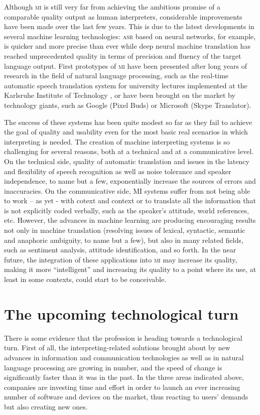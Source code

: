 \documentclass[output=paper]{langsci/langscibook}
\begin{document}
Although \textsc{mi} is still very far from achieving  the ambitious promise of a comparable quality output as human interpreters, considerable improvements have been made over the last few years. This is due to the latest developments in several machine learning technologies: \textsc{asr} based on neural networks, for example, is quicker and more precise than ever while deep neural machine translation has reached unprecedented quality in terms of precision and fluency of the target language output. First prototypes of \textsc{mi} have been presented after long years of research in the field of natural language processing, such as the real-time automatic speech translation system for university lectures implemented at the Karlsruhe Institute of Technology \citep{muller_lecture_2016}, or have been brought on the market by technology giants, such as Google (Pixel Buds) or Microsoft (Skype Translator).  
 
The success of these systems has been quite modest so far as they fail to achieve the goal of quality and usability even for the most basic real scenarios in which interpreting is needed. The creation of machine interpreting systems is so challenging for several reasons, both at a technical and at a communicative level. On the technical side, quality of automatic translation and issues in the latency and flexibility of speech recognition as well as noise tolerance and speaker independence, to name but a few, exponentially increase the sources of errors and inaccuracies. On the communicative side, \textsc{MI} systems suffer from not being able to work – as yet - with cotext and context or to translate all the information that is not explicitly coded verbally, such as the speaker's attitude, world references, etc. However, the advances in machine learning are producing encouraging results not only in machine translation (resolving issues of lexical, syntactic, semantic and anaphoric ambiguity, to name but a few), but also in many related fields, such as sentiment analysis, attitude identification, and so forth. In the near future, the integration of these applications into \textsc{mi} may increase its quality, making it more ``intelligent'' and increasing its quality to a point where its use, at least in some contexts, could start to be conceivable.
 
\section{The upcoming technological turn} 
There is some evidence that the profession is heading towards a technological turn. First of all, the interpreting-related solutions brought about by new advances in information and communication technologies as well as in natural language processing are growing in number, and the speed of change is significantly faster than it was in the past. In the three areas indicated above, companies are investing time and effort in order to launch an ever increasing number of software and devices on the market, thus reacting to users’ demands but also creating new ones.
 
\end{document}
